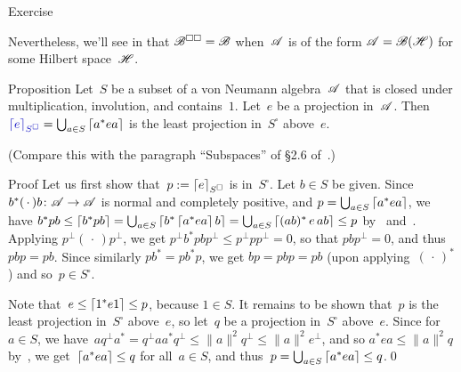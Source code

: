 \documentclass[a]{subfiles}
\begin{document}
\begin{parsec}
\begin{point}{Exercise}
\begin{enumerate}
Nevertheless,
we'll see in  that $\mathscr{B}^{\square\square}=\mathscr{B}$
when~$\mathscr{A}$ is of the form $\mathscr{A}=\mathscr{B}(\mathscr{H})$
for some Hilbert space~$\mathscr{H}$.
\end{enumerate}
\end{point}
\begin{point}{Proposition}%
Let~$S$ be a subset of a von Neumann algebra~$\mathscr{A}$
that is closed under multiplication, involution, and contains~$1$.
Let~$e$ be a projection in~$\mathscr{A}$.
Then $\Define{\ceil{e}_{S^\square}}= 
\bigcup_{a\in S} \ceil{a^* e a}$
is the least projection in~$S^\square$
above~$e$.

(Compare this with the paragraph ``Subspaces'' of \S2.6 of~\cite{kr}.)
\begin{point}{Proof}%
Let us first show that~$p:= \left\lceil e\right\rceil_{S^\square}$
is in~$S^\square$.
Let $b\in S$ be given.
Since~$b^*(\,\cdot\,)b\colon \mathscr{A}\to\mathscr{A}$
is normal and completely positive,
and $p=\bigcup_{a\in S} \left\lceil a^*ea\right\rceil$,
we have $b^*pb\leq \left\lceil b^*pb\right\rceil = 
\bigcup_{a\in S} \left\lceil b^* \left\lceil a^* e a\right\rceil b \right\rceil
= \bigcup_{a\in S} \left\lceil(ab)^* \,e\, ab\right\rceil \leq p$
by~ and~.
Applying $p^\perp(\,\cdot\,)p^\perp$,
we get $p^\perp b^*pb p^\perp 
\leq p^\perp p p^\perp = 0$,
so that $pbp^\perp=0$,
and thus $pbp=pb$.
Since similarly $pb^* =pb^*p$,
we get  $bp=pbp=pb$
(upon applying~$(\,\cdot\,)^*$) and so~$p\in S^\square$.

Note that~$e\leq \left\lceil1^* e 1\right\rceil\leq p$, because $1\in S$.
It remains to be shown that~$p$ is the least projection in~$S^\square$
above~$e$, so let~$q$ be a projection in~$S^\square$ above~$e$.
Since for~$a\in S$,
we have~$aq^\perp a^*=  q^\perp aa^* q^\perp 
\leq \|a\|^2q^\perp \leq \|a\|^2e^\perp$,
and so $a^*ea\leq \|a\|^2q$ by~\TODO{},
we get~$\left\lceil a^*ea\right\rceil\leq q$
for all~$a\in S$,
and thus~$p=\bigcup_{a\in S}\left\lceil a^*ea\right\rceil \leq q$.\qed
\end{point}
\end{point}


\end{parsec}
\end{document}
